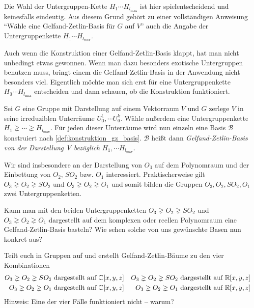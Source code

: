 \begin{remark}
		Die Wahl der Untergruppen-Kette $H_1\cdots H_{l_{\text{max}}}$ ist hier spielentscheidend und keinesfalls eindeutig. Aus diesem Grund gehört zu einer vollständigen Anweisung \enquote{Wähle eine Gelfand-Zetlin-Basis für $G$ auf $V$} auch die Angabe der Untergruppenkette $H_1\cdots H_{l_{\text{max}}}$.
\end{remark}
\begin{remark}
	Auch wenn die Konstruktion einer Gelfand-Zetlin-Basis klappt, hat man nicht unbedingt etwas gewonnen. Wenn man dazu besonders exotische Untergruppen benutzen muss, bringt einem die Gelfand-Zetlin-Basis in der Anwendung nicht besonders viel. Eigentlich möchte man sich erst für eine Untergruppenkette $H_0\cdots H_{l_{\text{max}}}$ entscheiden und dann schauen, ob die Konstruktion funktioniert.
\end{remark}
\begin{definition}[$\Gae\jae\el\soft\fae\aaa\en\dae$-$\Zae\jae\tae\el\iii\en$-$\Bae\aaa\sae\aaa$]
	\label{def:gz_basis}
	Sei $G$ eine Gruppe mit Darstellung auf einem Vektorraum $V$ und $G$ zerlege $V$ in seine irreduziblen Unterräume $U^1_0,\cdots U^k_0$. Wähle außerdem eine Untergruppenkette $H_1 \gneq\cdots\gneq H_{l_{\text{max}}}$. Für jeden dieser Unterräume wird nun einzeln eine Basis $\mathcal{B}$ konstruiert nach \ref{def:konstruktion_gz_basis}. $\mathcal{B}$ heißt dann \emph{Gelfand-Zetlin-Basis von der Darstellung V bezüglich} $H_1,\cdots H_{l_{\text{max}}}$. 
\end{definition}

\begin{remark}
	Wir sind insbesondere an der Darstellung von $O_3$ auf dem Polynomraum und der Einbettung von $O_2$, $SO_2$ bzw. $O_1$ interessiert. Praktischerweise gilt $O_3\gneq O_2\gneq SO_2$ und  $O_3\gneq O_2\gneq O_1$ und somit bilden die Gruppen $O_3, O_2, SO_2, O_1$ zwei Untergruppenketten.
\end{remark}

\begin{centralquestion}[Fortsetzung]\label{cq:fortsetzung}
	Kann man mit den beiden Untergruppenketten $O_3\gneq O_2\gneq SO_2$ und  $O_3\gneq O_2\gneq O_1$ dargestellt auf dem komplexen oder reellen Polynomraum eine Gelfand-Zetlin-Basis basteln? Wie sehen solche von uns gewünschte Basen nun konkret aus?

	Teilt euch in Gruppen auf und erstellt Gelfand-Zetlin-Bäume zu den vier Kombinationen
	\begin{align*}
		O_3\gneq O_2\gneq SO_2 \text{ dargestellt auf }& \mathbb{C}[x,y,z] & O_3\gneq O_2\gneq SO_2 \text{ dargestellt auf }& \mathbb{R}[x,y,z] \\
		O_3\gneq O_2\gneq O_1 \text{ dargestellt auf }& \mathbb{C}[x,y,z] & O_3\gneq O_2\gneq O_1 \text{ dargestellt auf }& \mathbb{R}[x,y,z]
	\end{align*}
	Hinweis: Eine der vier Fälle funktioniert nicht -- warum?
\end{centralquestion}

